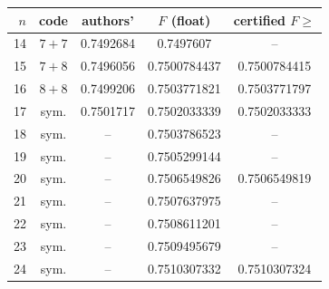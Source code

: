 \begin{tabular}{@{}rcccc@{}}
\toprule
$n$ & code & authors' & $F$ (float) & certified $F\ge$ \\
\midrule
14 & $7{+}7$ & 0.7492684 & 0.7497607 & -- \\
15 & $7{+}8$ & 0.7496056 & 0.7500784437 & 0.7500784415 \\
16 & $8{+}8$ & 0.7499206 & 0.7503771821 & 0.7503771797 \\
17 & sym. & 0.7501717 & 0.7502033339 & 0.7502033333 \\
18 & sym. & -- & 0.7503786523 & -- \\
19 & sym. & -- & 0.7505299144 & -- \\
20 & sym. & -- & 0.7506549826 & 0.7506549819 \\
21 & sym. & -- & 0.7507637975 & -- \\
22 & sym. & -- & 0.7508611201 & -- \\
23 & sym. & -- & 0.7509495679 & -- \\
24 & sym. & -- & 0.7510307332 & 0.7510307324 \\
\bottomrule
\end{tabular}
